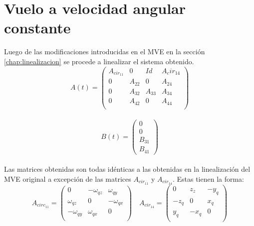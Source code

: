 \section{Vuelo a velocidad angular constante}
Luego de las modificaciones introducidas en el MVE en la secci\'on \ref{chap:linealizacion} se procede a linealizar el sistema obtenido.
\begin{equation}
A(t)=\left(\begin{array}{cccc}
A_{cir_{11}} & 0 & Id & A{_cir_{14}}  \\
0 & A_{22} & 0      & A_{24}\\
0 & A_{32} & A_{33} & A_{34}\\
0 & A_{42}      & 0      & A_{44} \\    
\end{array}\right)
\end{equation}\\


\begin{equation}
B(t)=\left(\begin{array}{c}
0\\
0\\
B_{31}\\
B_{41} 
\end{array}\right)
\end{equation}\\

Las matrices obtenidas son todas id\'enticas a las obtenidas en la linealizaci\'on del MVE original a excepci\'on de las matrices $A_{cir_{11}}$ y $A_{cir_{14}}$. Estas tienen la forma:
\begin{equation}
A_{circ_{11}}=\left(\begin{array}{ccc}
0 & -\omega_{qz} & \omega_{qy} \\
\omega_{qz} & 0 & -\omega_{qx}\\
-\omega_{qy} & \omega_{qx} &0\\

\end{array}\right) \quad 
A_{cir_{14}}=\left(\begin{array}{ccc}
0 & z_{z} & -y_{q} \\
-z_{q} & 0 & x_{q}\\
y_{q} & -x_{q} &0\\
\end{array}\right)
\end{equation}

%